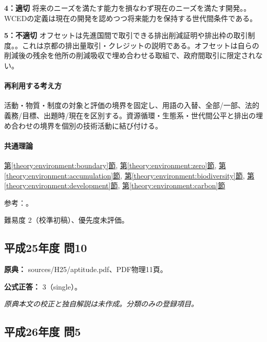 \noindent\textbf{4：適切} 将来のニーズを満たす能力を損なわず現在のニーズを満たす開発。。WCEDの定義は現在の開発を認めつつ将来能力を保持する世代間条件である。\par

\noindent\textbf{5：不適切} オフセットは先進国間で取引できる排出削減証明や排出枠の取引制度。。これは京都の排出量取引・クレジットの説明である。オフセットは自らの削減後の残余を他所の削減吸収で埋め合わせる取組で、政府間取引に限定されない。\par

\paragraph{再利用する考え方} 活動・物質・制度の対象と評価の境界を固定し、用語の入替、全部/一部、法的義務/目標、出題時/現在を区別する。資源循環・生態系・世代間公平と排出の埋め合わせの境界を個別の技術活動に結び付ける。

\paragraph{共通理論} \hyperref[theory:environment:boundary]{第\ref*{theory:environment:boundary}節}, \hyperref[theory:environment:zero]{第\ref*{theory:environment:zero}節}, \hyperref[theory:environment:accumulation]{第\ref*{theory:environment:accumulation}節}, \hyperref[theory:environment:biodiversity]{第\ref*{theory:environment:biodiversity}節}, \hyperref[theory:environment:development]{第\ref*{theory:environment:development}節}, \hyperref[theory:environment:carbon]{第\ref*{theory:environment:carbon}節}

\par 参考：\cite{env_zero2008,env_foodchain,env_biodiversity,env_development,env_offset2008}。

\par 難易度 2（校準初稿）、優先度未評価。

\subsection{平成25年度 問10}
\label{q:h25-reg-apt-10}

\noindent\textbf{原典：} sources/H25/aptitude.pdf、PDF物理11頁。

\textbf{公式正答：} 3（single）。

\par\textit{原典本文の校正と独自解説は未作成。分類のみの登録項目。}

\subsection{平成26年度 問5}
\label{q:h26-reg-apt-05}

